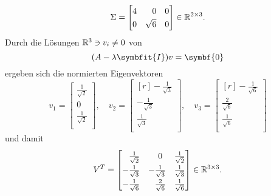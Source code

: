 \begin{example}
    \begin{equation*}
        \Sigma=
        \begin{bmatrix}
            4 & \phantom{\surd}0 & 0 \\
            0 & \sqrt{6} & 0
        \end{bmatrix} \in \R^{2 \times 3}.
    \end{equation*}
    Durch die Lösungen \(\mathbb{R}^{3} \ni v_i \neq 0\) von
    \begin{equation*}
        (A - \lambda\symbfit{I})v = \symbf{0}
    \end{equation*}
    ergeben sich die normierten Eigenvektoren
    \begin{equation*}
        \renewcommand{\arraystretch}{1.4}
        v_1 =
        \begin{bmatrix}
            \frac{1}{\sqrt{2}} \\
            0 \\
            \frac{1}{\sqrt{2}} \\
        \end{bmatrix}, \quad
        v_2 =
        \begin{bmatrix*}[r]
            -\frac{1}{\sqrt{3}} \\
            -\frac{1}{\sqrt{3}} \\
            \frac{1}{\sqrt{3}} \\
        \end{bmatrix*}, \quad
        v_3 =
        \begin{bmatrix*}[r]
            -\frac{1}{\sqrt{6}} \\
            \frac{2}{\sqrt{6}} \\
            \frac{1}{\sqrt{6}} \\
        \end{bmatrix*}
    \end{equation*} 
    und damit
    \begin{equation*}
        \renewcommand{\arraystretch}{1.3}
        V^{T} =
        \begin{bmatrix}
            \phantom{-}\frac{1}{\sqrt{2}} & \phantom{-}0 & \frac{1}{\sqrt{2}} \\
            -\frac{1}{\sqrt{3}} & -\frac{1}{\sqrt{3}} & \frac{1}{\sqrt{3}} \\
            -\frac{1}{\sqrt{6}} & \phantom{-}\frac{2}{\sqrt{6}} & \frac{1}{\sqrt{6}} \\
        \end{bmatrix} \in \R^{3 \times 3}.
    \end{equation*}

\end{example}
